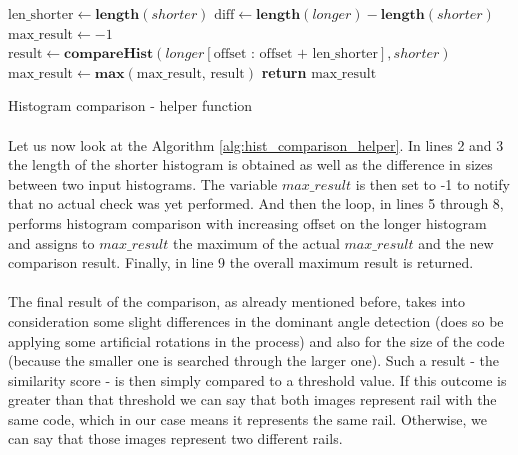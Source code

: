 \begin{algorithm}
	\begin{spacing}{1.5}
	\begin{algorithmic}[1]
			\State $\text{len\_shorter} \gets \textbf{length}(shorter)$
			\State $\text{diff} \gets \textbf{length}(longer) - \textbf{length}(shorter)$
			\State $\text{max\_result} \gets -1$
				\State $\text{result} \gets \textbf{compareHist}(longer[\text{offset : offset + len\_shorter}], shorter)$
				\State $\text{max\_result} \gets \textbf{max}(\text{max\_result, result})$
			\EndFor
			\State \textbf{return} $\text{max\_result}$
		\EndFunction
	\end{algorithmic}
	\end{spacing}
	\caption{Histogram comparison - helper function}
	\label{alg:hist_comparison_helper}
\end{algorithm}

\paragraph{}
Let us now look at the Algorithm \ref{alg:hist_comparison_helper}. In lines 2 and 3 the length of the shorter histogram is obtained as well as the difference in sizes between two input histograms. The variable $max\_result$ is then set to -1 to notify that no actual check was yet performed. And then the loop, in lines 5 through 8, performs histogram comparison with increasing offset on the longer histogram and assigns to $max\_result$ the maximum of the actual $max\_result$ and the new comparison result. Finally, in line 9 the overall maximum result is returned.

\paragraph{}
The final result of the comparison, as already mentioned before, takes into consideration some slight differences in the dominant angle detection (does so be applying some artificial rotations in the process) and also for the size of the code (because the smaller one is searched through the larger one). Such a result - the similarity score - is then simply compared to a threshold value. If this outcome is greater than that threshold we can say that both images represent rail with the same code, which in our case means it represents the same rail. Otherwise, we can say that those images represent two different rails.

